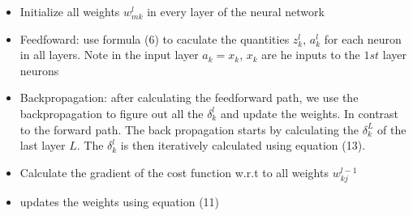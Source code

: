\documentclass[12pt, oneside]{article}
\begin{document}
\begin{itemize}
\item Initialize all weights $w_{mk}^l$ in every layer of the neural network
\item Feedfoward: use formula (6) to caculate the quantities $z_k^l$, $a_k^l$ for each neuron in all layers. Note in the input layer $a_k=x_k$, $x_k$ are he inputs to the $1st$ layer neurons
\item Backpropagation: after calculating the feedforward path, we use the backpropagation to figure out all the $\delta_k^l$ and update the weights. In contrast to the forward path. The back propagation starts by calculating the $\delta_k^L$ of the last layer $L$. The $\delta_k^l$ is then iteratively calculated using equation (13).
\item Calculate the gradient of the cost function w.r.t to all weights $w_{kj}^{l-1}$
\item updates the weights using equation (11)

\end{itemize}
\end{document}
